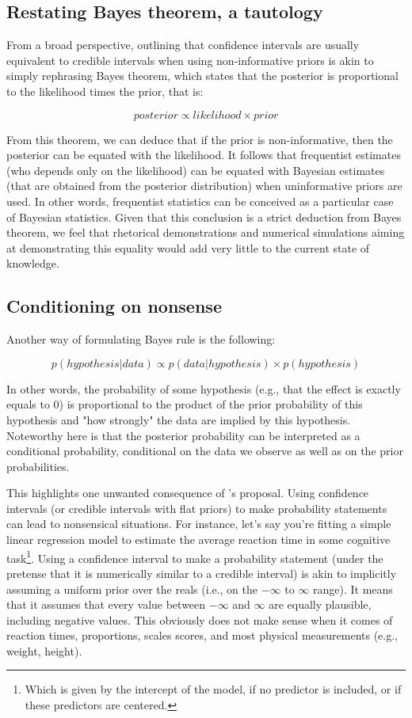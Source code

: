 \documentclass[a4paper,man,natbib,floatsintext,donotrepeattitle]{apa6}
\begin{document}
\subsection{Restating Bayes theorem, a tautology}

From a broad perspective, outlining that confidence intervals are usually equivalent to credible intervals when using non-informative priors is akin to simply rephrasing Bayes theorem, which states that the posterior is proportional to the likelihood times the prior, that is:

$$ posterior \propto likelihood \times prior $$

From this theorem, we can deduce that if the prior is non-informative, then the posterior can be equated with the likelihood. It follows that frequentist estimates (who depends only on the likelihood) can be equated with Bayesian estimates (that are obtained from the posterior distribution) when uninformative priors are used. In other words, frequentist statistics can be conceived as a particular case of Bayesian statistics. Given that this conclusion is a strict deduction from Bayes theorem, we feel that rhetorical demonstrations and numerical simulations aiming at demonstrating this equality would add very little to the current state of knowledge.

\subsection{Conditioning on nonsense}

Another way of formulating Bayes rule is the following:

$$ p(hypothesis|data) \propto p(data|hypothesis) \times p(hypothesis) $$

In other words, the probability of some hypothesis (e.g., that the effect is exactly equals to 0) is proportional to the product of the prior probability of this hypothesis and "how strongly" the data are implied by this hypothesis. Noteworthy here is that the posterior probability can be interpreted as a conditional probability, conditional on the data we observe as well as on the prior probabilities.

This highlights one unwanted consequence of \cite{albers_credible_2018}'s proposal. Using confidence intervals (or credible intervals with flat priors) to make probability statements can lead to nonsensical situations. For instance, let's say you're fitting a simple linear regression model to estimate the average reaction time in some cognitive task\footnote{Which is given by the intercept of the model, if no predictor is included, or if these predictors are centered.}. Using a confidence interval to make a probability statement (under the pretense that it is numerically similar to a credible interval) is akin to implicitly assuming a uniform prior over the reals (i.e., on the $-\infty$ to $\infty$ range). It means that it assumes that every value between $-\infty$ and $\infty$ are equally plausible, including negative values. This obviously does not make sense when it comes of reaction times, proportions, scales scores, and most physical measurements (e.g., weight, height).
\end{document}
